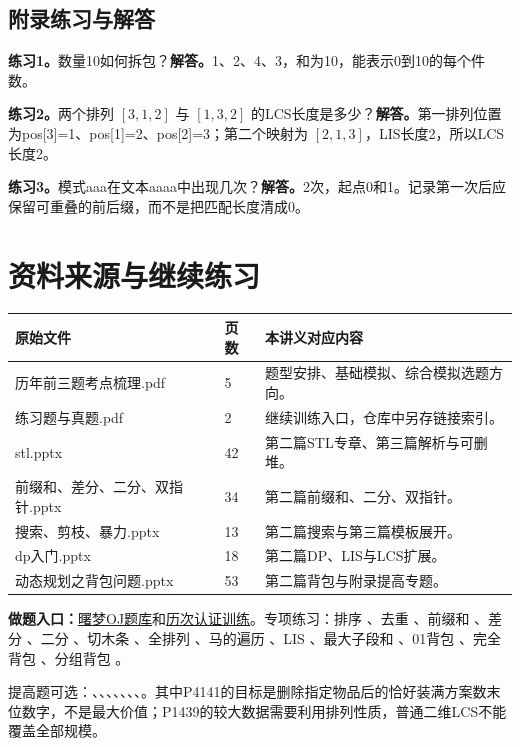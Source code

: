\subsection{附录练习与解答}
\textbf{练习1。}数量10如何拆包？\textbf{解答。}1、2、4、3，和为10，能表示0到10的每个件数。

\textbf{练习2。}两个排列 $[3,1,2]$ 与 $[1,3,2]$ 的LCS长度是多少？\textbf{解答。}第一排列位置为pos[3]=1、pos[1]=2、pos[2]=3；第二个映射为 $[2,1,3]$，LIS长度2，所以LCS长度2。

\textbf{练习3。}模式aaa在文本aaaa中出现几次？\textbf{解答。}2次，起点0和1。记录第一次后应保留可重叠的前后缀，而不是把匹配长度清成0。
\newpage
\section{资料来源与继续练习}

\begin{longtable}{P{7.4cm}P{1cm}P{6cm}}
\toprule 原始文件 & 页数 & 本讲义对应内容\\\midrule\endhead
历年前三题考点梳理.pdf & 5 & 题型安排、基础模拟、综合模拟选题方向。\\
练习题与真题.pdf & 2 & 继续训练入口，仓库中另存链接索引。\\
stl.pptx & 42 & 第二篇STL专章、第三篇解析与可删堆。\\
前缀和、差分、二分、双指针.pptx & 34 & 第二篇前缀和、二分、双指针。\\
搜索、剪枝、暴力.pptx & 13 & 第二篇搜索与第三篇模板展开。\\
dp入门.pptx & 18 & 第二篇DP、LIS与LCS扩展。\\
动态规划之背包问题.pptx & 53 & 第二篇背包与附录提高专题。\\
\bottomrule
\end{longtable}

\textbf{做题入口：}\href{https://oj.shumeng.tech/p}{曙梦OJ题库}和\href{https://oj.shumeng.tech/training/68330d72efce6d5ac2765a62}{历次认证训练}。专项练习：排序 、去重 、前缀和 、差分 、二分 、切木条 、全排列 、马的遍历 、LIS 、最大子段和 、01背包 、完全背包 、分组背包 。

提高题可选：、、、、、、、。其中P4141的目标是删除指定物品后的恰好装满方案数末位数字，不是最大价值；P1439的较大数据需要利用排列性质，普通二维LCS不能覆盖全部规模。

